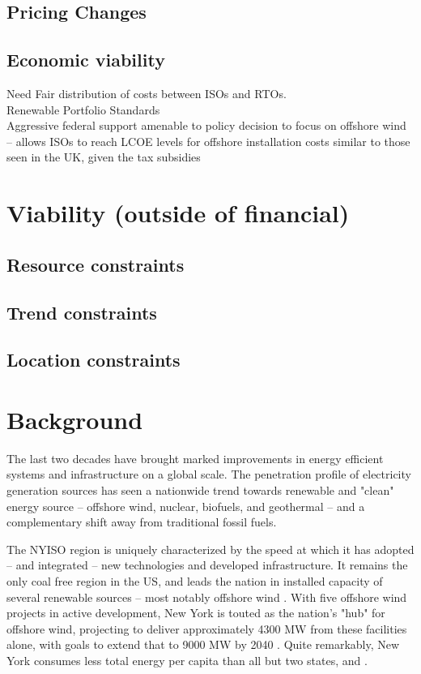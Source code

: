 \documentclass[plain]{article}
\newcommand{\1}{\mathbbm{1}}
\begin{document}
\subsection{Pricing Changes}
\subsection{Economic viability}
Need Fair distribution of costs between ISOs and RTOs. \cite{mitchell_review_2022}\\
Renewable Portfolio Standards\\
Aggressive federal support amenable to policy decision to focus on offshore wind -- allows ISOs to reach LCOE  levels for offshore installation costs similar to those seen in the UK, given the tax subsidies \cite{mitchell_review_2022}\\

\section{Viability (outside of financial)}
\subsection{Resource constraints}
\subsection{Trend constraints}
\subsection{Location constraints}
\section{Background}
The last two decades have brought marked improvements in energy efficient systems and infrastructure on a global scale. The penetration profile of electricity generation sources has seen a nationwide trend towards renewable and "clean" energy source -- offshore wind, nuclear, biofuels, and geothermal -- and a complementary shift away from traditional fossil fuels. 

The NYISO region is uniquely characterized by the speed at which it has adopted -- and integrated -- new technologies and developed infrastructure. It remains the only coal free region in the US, and leads the nation in installed capacity of several renewable sources -- most notably offshore wind \cite{noauthor_new_nodate-1} . With five offshore wind projects in active development, New York is touted as the nation's "hub" for offshore wind, projecting to deliver approximately 4300 MW from these facilities alone, with goals to extend that to 9000 MW by 2040 . Quite remarkably, New York consumes less total energy per capita than all but two states, and .
\end{document}
